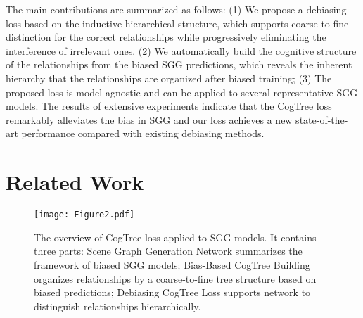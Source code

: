 \documentclass{article}
\begin{document}
The main contributions are summarized as follows: (1) We propose a debiasing loss based on the inductive hierarchical structure,  which supports coarse-to-fine distinction for the correct relationships while progressively eliminating the interference of irrelevant ones. (2) We automatically build the cognitive structure of the relationships from the biased SGG predictions, which reveals the inherent hierarchy that the relationships are organized after biased training; 
 (3) The proposed loss is model-agnostic and can be applied to several representative SGG models. The results of extensive experiments indicate that the CogTree loss remarkably alleviates the bias in SGG and our loss achieves a new state-of-the-art performance compared with existing debiasing methods. 











\section{Related Work}
\label{sec:relatedWork}
\begin{figure*}[ht]
    \centering
    \texttt{[image: Figure2.pdf]}
    \caption{The overview of CogTree loss applied to SGG models. It contains three parts: Scene Graph Generation Network summarizes the framework of biased SGG models; Bias-Based CogTree Building organizes relationships by a coarse-to-fine tree structure based on biased predictions; Debiasing CogTree Loss supports network to distinguish relationships hierarchically. }
    \label{fig:framwork}
\end{figure*}
\end{document}
